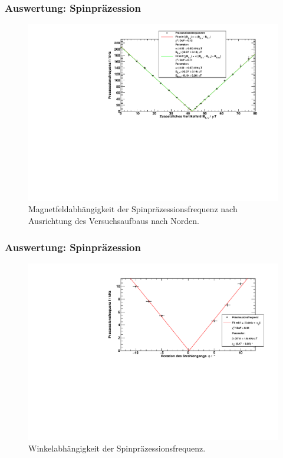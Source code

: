 \begin{frame}
\frametitle{Auswertung: Spinpräzession}

\begin{figure}
    \centering
    \includegraphics[width=\textwidth]{../img/Rb85_gedreht.pdf}
    \caption{Magnetfeldabhängigkeit der Spinpräzessionsfrequenz nach Ausrichtung des Versuchsaufbaus nach Norden.}  
\end{figure} 
  
\end{frame}




\begin{frame}
\frametitle{Auswertung: Spinpräzession}

\begin{figure}
    \centering
    \includegraphics[width=\textwidth]{../img/winkel.pdf}
    \caption{Winkelabhängigkeit der Spinpräzessionsfrequenz.}  
\end{figure} 
  
\end{frame}

